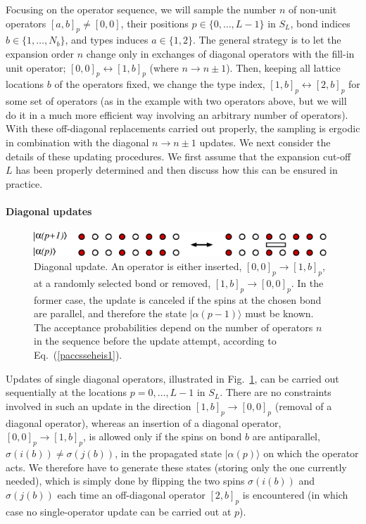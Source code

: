 \documentclass[draft,numberedheadings]{aipproc}
\begin{document}
Focusing on the operator sequence, we will sample the number $n$ of non-unit operators $[a,b]_p\not=[0,0]$, their positions $p\in \{0,\ldots,L-1\}$ in $S_L$, 
bond indices $b \in \{1,\ldots,N_b\}$, and types induces $a\in \{1,2\}$. The general strategy is to let the expansion order $n$ change only in exchanges of 
diagonal operators with the fill-in unit operator; $[0,0]_p \leftrightarrow [1,b]_p$ (where $n \to n \pm 1$). Then, keeping all lattice locations $b$ of the 
operators fixed, we change the type index, $[1,b]_p \leftrightarrow [2,b]_p$ for some set of operators (as in the example with two operators above, but we 
will do it in a much more efficient way involving an arbitrary number of operators). With these off-diagonal replacements carried out properly, the sampling 
is ergodic in combination with the diagonal $n \to n \pm 1$ updates. We next consider the details of these updating procedures. We first assume that the 
expansion cut-off $L$ has been properly determined and then discuss  how this can be ensured in practice.

\paragraph{Diagonal updates}

\begin{figure}
\includegraphics[width=11cm, clip]{diagupdate.eps}
\caption{Diagonal update. An operator is either inserted, $[0,0]_p\rightarrow [1,b]_p$, at a randomly selected bond or removed, 
$[1,b]_p\rightarrow [0,0]_p$.  In the former case, the update is canceled if the spins at the chosen bond are parallel, and therefore the state 
$|\alpha(p-1)\rangle$ must be known. The acceptance probabilities depend on the number of operators $n$ in the sequence before the update attempt, 
according to Eq.~(\ref{paccsseheis1}).}
\label{diagupdate}
\end{figure}

Updates of single diagonal operators, illustrated in Fig.~\ref{diagupdate}, can be carried out sequentially at the locations $p=0,\ldots,L-1$ in $S_L$. 
There are no constraints involved in such an update in the direction $[1,b]_p \to [0,0]_p$ (removal of a diagonal operator), whereas an insertion of a
diagonal operator, $[0,0]_p \to [1,b]_p$, is allowed only if the spins on bond $b$ are antiparallel, $\sigma(i(b)) \not= \sigma(j(b))$, in the propagated 
state $|\alpha(p)\rangle$ on which the operator acts. We therefore have to generate these states (storing only the one currently needed), which is simply 
done by flipping the two spins $\sigma(i(b))$ and $\sigma(j(b))$ each time an off-diagonal operator $[2,b]_p$ is encountered (in which case no 
single-operator update can be carried out at $p$). 
\end{document}
